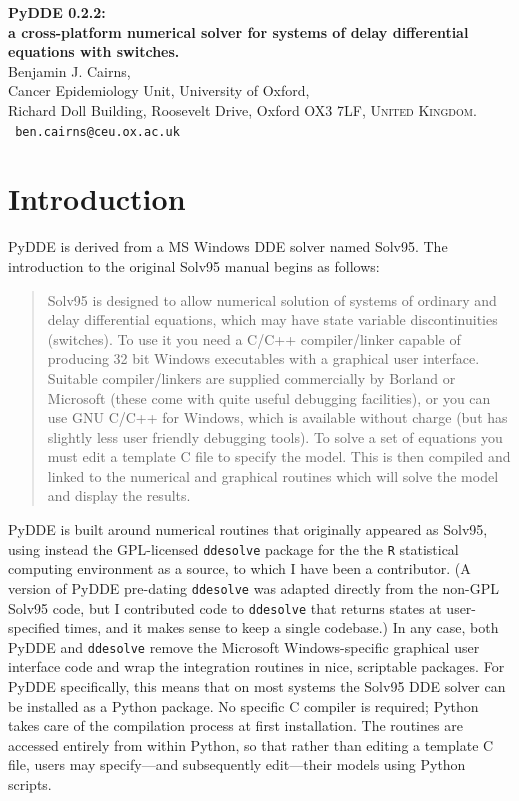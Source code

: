 \documentclass[10pt,a4paper] {article}
\begin{document}
\begin{center}
{\Large \bf PyDDE 0.2.2: \\a cross-platform numerical solver for systems of delay differential equations with switches.\\}
\vspace{0.3cm}
Benjamin J. Cairns,\\ Cancer Epidemiology Unit, University of Oxford, \\Richard Doll Building, Roosevelt Drive, Oxford OX3 7LF, \textsc{United Kingdom}.\\ {\tt %
ben.cairns@ceu.ox.ac.uk}
\end{center}

\tableofcontents

\section{Introduction}

PyDDE is derived from a MS Windows DDE solver named Solv95.  The introduction to the original Solv95 manual begins as follows:

\begin{quotation}
Solv95 is designed to allow numerical solution of systems of ordinary and delay differential equations, which may have state variable discontinuities (switches). To use it you need a C/C++ compiler/linker capable of producing 32 bit Windows executables with a graphical user interface.  Suitable compiler/linkers are supplied commercially by Borland or Microsoft (these come with quite useful debugging facilities), or you can use GNU C/C++ for Windows, which is available without charge (but has slightly less user friendly debugging tools).  To solve a set of equations you must edit a template C file to specify the model. This is then compiled and linked to the numerical and graphical routines which will solve the model and display the results.
\end{quotation}

PyDDE is built around numerical routines that originally appeared as Solv95, using instead the GPL-licensed \verb+ddesolve+ package for the the \verb+R+ statistical computing environment as a source, to which I have been a contributor.  (A version of PyDDE pre-dating \verb+ddesolve+ was adapted directly from the non-GPL Solv95 code, but I contributed code to \verb+ddesolve+ that returns states at user-specified times, and it makes sense to keep a single codebase.)  In any case, both PyDDE and \verb+ddesolve+ remove the Microsoft Windows-specific graphical user interface code and wrap the integration routines in nice, scriptable packages.  For PyDDE specifically, this means that on most systems the Solv95 DDE solver can be installed as a Python package.  No specific C compiler is required; Python takes care of the compilation process at first installation.  The routines are accessed entirely from within Python, so that rather than editing a template C file, users may specify---and subsequently edit---their models using Python scripts.
\end{document}
